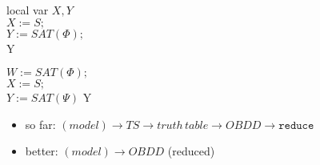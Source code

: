 \documentclass[a4paper, 10pt]{article}
\begin{document}
\begin{mdframed}
\begin{algorithm}[H]
local var $X,Y$ \\
$X:=S;$ \\
$Y:=SAT(\Phi);$ \\
\Return Y
\end{algorithm}

\begin{algorithm}[H]
$W:=SAT(\Phi);$ \\
$X:=S;$ \\
$Y:=SAT(\Psi)$
\Return Y
\end{algorithm}

\begin{itemize}
    \item so far: $(model)\to TS \to truth\,table\to OBDD\to\texttt{reduce}$
    \item better: $(model)\to OBDD$ (reduced)
\end{itemize}
\end{mdframed}
\end{document}
